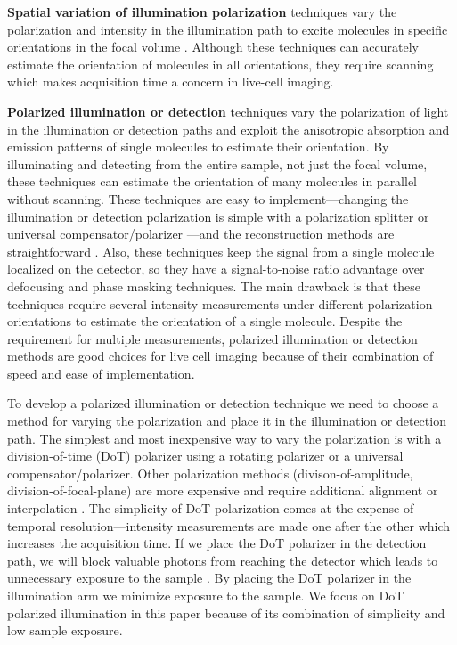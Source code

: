 \documentclass[10pt]{article}
\begin{document}
\textbf{Spatial variation of illumination polarization} techniques vary the
polarization and intensity in the illumination path to excite molecules in
specific orientations in the focal volume \cite{debarre2004}. Although these
techniques can accurately estimate the orientation of molecules in all
orientations, they require scanning which makes acquisition time a concern in
live-cell imaging.

\textbf{Polarized illumination or detection} techniques vary the polarization of
light in the illumination or detection paths and exploit the anisotropic
absorption and emission patterns of single molecules to estimate their
orientation. By illuminating and detecting from the entire sample, not just the
focal volume, these techniques can estimate the orientation of many molecules in
parallel without scanning. These techniques are easy to implement---changing the
illumination or detection polarization is simple with a polarization splitter
\cite{mehta2016} or universal compensator/polarizer \cite{shribak2003}---and the
reconstruction methods are straightforward \cite{fourkas2001, mehta2016,
  backer2016}. Also, these techniques keep the signal from a single molecule
localized on the detector, so they have a signal-to-noise ratio advantage over
defocusing and phase masking techniques. The main drawback is that these
techniques require several intensity measurements under different polarization
orientations to estimate the orientation of a single molecule. Despite the
requirement for multiple measurements, polarized illumination or detection
methods are good choices for live cell imaging because of their combination of
speed and ease of implementation.

To develop a polarized illumination or detection technique we need to choose a
method for varying the polarization and place it in the illumination or
detection path. The simplest and most inexpensive way to vary the polarization
is with a division-of-time (DoT) polarizer using a rotating polarizer or a
universal compensator/polarizer. Other polarization methods
(divison-of-amplitude, division-of-focal-plane) are more expensive and require
additional alignment or interpolation \cite{tyo2006}. The simplicity of DoT
polarization comes at the expense of temporal resolution---intensity
measurements are made one after the other which increases the acquisition
time. If we place the DoT polarizer in the detection path, we will block
valuable photons from reaching the detector which leads to unnecessary exposure
to the sample \cite{demay2011}. By placing the DoT polarizer in the illumination
arm we minimize exposure to the sample. We focus on DoT polarized illumination
in this paper because of its combination of simplicity and low sample exposure.
\end{document}
